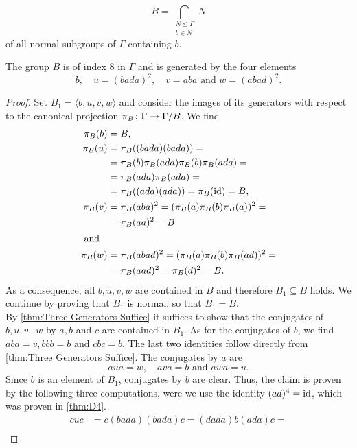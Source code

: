 \begin{equation*}
B=\bigcap_{\substack{N\unlhd\Gamma\\b\in N}}N
\end{equation*}
of all normal subgroups of $\Gamma$ containing $b$.
\begin{lem}\label{thm:B}
The group $B$ is of index $8$ in $\Gamma$ and is generated by the four elements
\begin{equation*}
b,\quad u=(bada)^2,\quad v=aba \text{ and } w=(abad)^2.
\end{equation*}
\end{lem}
\begin{proof}
Set $B_1=\langle b,u,v,w\rangle$ and consider the images of its generators with respect to the canonical projection $\pi_B\colon\Gamma\to\nicefrac{\Gamma}{B}$. We find
\begin{align*}
\pi_B(b)&=B,\\
\pi_B(u)	&=\pi_B((bada)(bada))=\\
				&=\pi_B(b)\pi_B(ada)\pi_B(b)\pi_B(ada)=\\
				&=\pi_B(ada)\pi_B(ada)=\\
				&=\pi_B((ada)(ada))=\pi_B(\id)=B,\\
\pi_B(v)	&=\pi_B(aba)^2=(\pi_B(a)\pi_B(b)\pi_B(a))^2=\\
				&=\pi_B(aa)^2=B \\
\intertext{ and}
\pi_B(w)	&=\pi_B(abad)^2=(\pi_B(a)\pi_B(b)\pi_B(ad))^2=\\
		&=\pi_B(aad)^2=\pi_B(d)^2=B.
\end{align*}
As a consequence, all $b,u,v,w$ are contained in $B$ and therefore $B_1\subseteq B$ holds. We continue by proving that $B_1$ is normal, so that $B_1=B$.\\
By \cref{thm:Three Generators Suffice} it suffices to show that the conjugates of $b,u,v,$ $w$ by $a,b$ and $c$ are contained in $B_1$. As for the conjugates of $b$, we find $aba=v, bbb=b$ and $cbc=b$. The last two identities follow directly from \cref{thm:Three Generators Suffice}. The conjugates by $a$ are
\begin{equation*}
aua=w, \quad ava=b \text{ and } awa=u.
\end{equation*}
Since $b$ is an element of $B_1$, conjugates by $b$ are clear. Thus, the claim is proven by the following three computations, were we use the identity $(ad)^4=\id$, which was proven in \cref{thm:D4}.
\begin{align*}
cuc	&=c(bada)(bada)c=(dada)b(ada)c=\\

\end{align*}
\end{proof}

